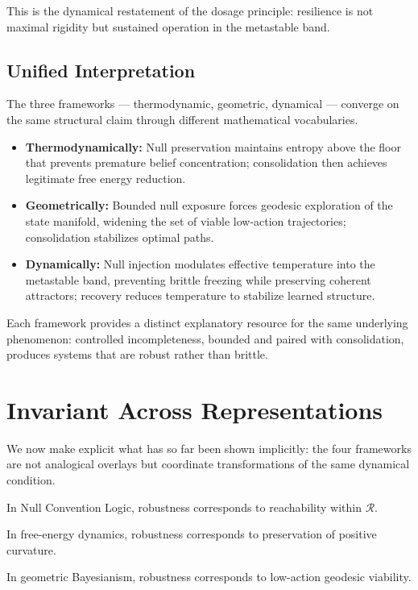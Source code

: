 \documentclass[11pt]{article}
\theoremstyle{remark}
\begin{document}
This is the dynamical restatement of the dosage principle: resilience is not maximal rigidity but sustained operation in the metastable band.

\subsection{Unified Interpretation}

The three frameworks --- thermodynamic, geometric, dynamical --- converge on the same structural claim through different mathematical vocabularies.

\begin{itemize}
  \item \textbf{Thermodynamically:} Null preservation maintains entropy above the floor that prevents premature belief concentration; consolidation then achieves legitimate free energy reduction.
  \item \textbf{Geometrically:} Bounded null exposure forces geodesic exploration of the state manifold, widening the set of viable low-action trajectories; consolidation stabilizes optimal paths.
  \item \textbf{Dynamically:} Null injection modulates effective temperature into the metastable band, preventing brittle freezing while preserving coherent attractors; recovery reduces temperature to stabilize learned structure.
\end{itemize}

Each framework provides a distinct explanatory resource for the same underlying phenomenon: controlled incompleteness, bounded and paired with consolidation, produces systems that are robust rather than brittle.

\section{Invariant Across Representations}
\label{sec:invariant}

We now make explicit what has so far been shown implicitly: the four frameworks are not analogical overlays but coordinate transformations of the same dynamical condition.

In Null Convention Logic, robustness corresponds to reachability within $\mathcal{R}$.

In free-energy dynamics, robustness corresponds to preservation of positive curvature.

In geometric Bayesianism, robustness corresponds to low-action geodesic viability.
\end{document}
